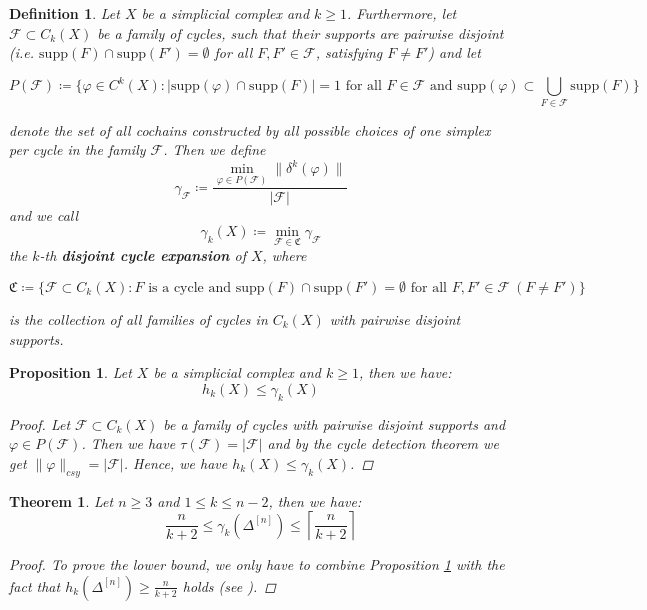 \documentclass{article}
\newcommand{\supp}{\mathrm{supp}}
\newtheorem{defi}{Definition}[section]
\newtheorem{prop}{Proposition}[section]
\newtheorem{thm}{Theorem}[section]
\begin{document}
\begin{defi}
Let $X$ be a simplicial complex and $k\geq 1$. Furthermore, let $\mathcal{F}\subset C_k(X)$ be a family of cycles, such that their supports are pairwise disjoint (i.e. $\supp(F)\cap\supp(F')=\emptyset$ for all $F,F'\in\mathcal{F}$, satisfying $F\neq F'$) and let
\begin{small}
\[
P(\mathcal{F})\coloneqq\{\varphi\in C^k(X):|\supp(\varphi)\cap\supp(F)|=1\text{ for all }F\in\mathcal{F}\text{ and }\supp(\varphi)\subset\bigcup\limits_{F\in\mathcal{F}}\supp(F)\}
\]
\end{small}
denote the set of all cochains constructed by all possible choices of one simplex per cycle in the family $\mathcal{F}$. Then we define
\[
\gamma_{\mathcal{F}}\coloneqq\frac{\min\limits_{\varphi\in P(\mathcal{F})}\|\delta^k(\varphi)\|}{|\mathcal{F}|}
\]
and we call
\[
\gamma_k(X)\coloneqq\min\limits_{\mathcal{F}\in\mathfrak{C}}\gamma_{\mathcal{F}}
\]
the $k$-th \textbf{disjoint cycle expansion} of $X$, where
\begin{small}
\[
\mathfrak{C}\coloneqq\{\mathcal{F}\subset C_k(X):F\text{ is a cycle and }\supp(F)\cap\supp(F')=\emptyset\text{ for all }F,F'\in\mathcal{F}\:(F\neq F')\}
\]
\end{small}
is the collection of all families of cycles in $C_k(X)$ with pairwise disjoint supports.
\end{defi}

\begin{prop}\label{proposition2}
Let $X$ be a simplicial complex and $k\geq 1$, then we have:
\[
h_k(X)\leq\gamma_k(X)
\]
\begin{proof}
Let $\mathcal{F}\subset C_k(X)$ be a family of cycles with pairwise disjoint supports and $\varphi\in P(\mathcal{F})$. Then we have $\tau(\mathcal{F})=|\mathcal{F}|$ and by the cycle detection theorem we get $\|\varphi\|_{csy}=|\mathcal{F}|$. Hence, we have $h_k(X)\leq\gamma_k(X)$.
\end{proof}
\end{prop}

\begin{thm}\label{theorem1}
Let $n\geq 3$ and $1\leq k\leq n-2$, then we have:
\[
\frac{n}{k+2}\leq\gamma_k(\Delta^{[n]})\leq\left\lceil\frac{n}{k+2}\right\rceil
\]
\begin{proof}
To prove the lower bound, we only have to combine Proposition \ref{proposition2} with the fact that $h_k(\Delta^{[n]})\geq\frac{n}{k+2}$ holds (see \cite{2}).
\end{proof}
\end{thm}
\end{document}
